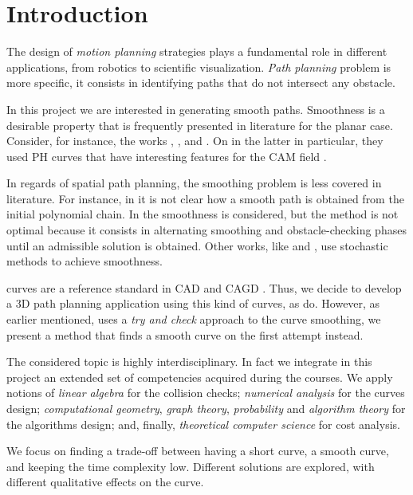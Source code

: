 \documentclass[dissertation.tex]{subfiles}
\begin{document}
\chapter{Introduction}
The design of \emph{motion planning} strategies plays a fundamental
role in different applications, from robotics to scientific
visualization. \emph{Path planning} problem is
more specific, it consists in identifying paths that do not
intersect any obstacle.

In this project we are interested in generating smooth
paths. Smoothness is a desirable property that is
frequently presented in literature for the planar case. Consider, for
instance, the works \cite{maekawa}, \cite{ho-liu}, \cite{li} and
\cite{giannelli}. On in the latter in particular, they used
\acf{PH} curves that have interesting features for the \acf{CAM} field
\cite{farouki}.

In regards of spatial path planning, the smoothing problem is less
covered in literature. For instance, in \cite{hrabar} it is not clear
how a smooth path is obtained from the initial polynomial chain. In
\cite{yang} the smoothness is considered, but the method is not
optimal because it consists in alternating smoothing and
obstacle-checking phases until an admissible solution is
obtained. Other works, like \cite{aghababa} and \cite{kroumov}, use 
stochastic methods to achieve smoothness.

\bs curves are a reference standard in \ac{CAD} and \ac{CAGD}
\cite{hughes}\cite{foley}\cite{farin}\cite{farin2}. Thus, we decide to
develop a 3D path planning application using this kind of curves, as
\cite{yang} do. However, as earlier mentioned,
\cite{yang} uses a \emph{try and check} approach to the curve
smoothing, we present a method that finds a smooth
curve on the first 
attempt instead.

The considered topic is highly interdisciplinary. In fact we integrate
in this project an extended set of
competencies acquired during the courses. We apply notions of
\emph{linear algebra} for the collision checks; \emph{numerical
  analysis} for the curves design; \emph{computational
  geometry},
\emph{graph theory}, \emph{probability} and \emph{algorithm theory}
for the algorithms design; and, finally, \emph{theoretical computer
  science} for cost analysis.

We focus on finding a trade-off between having a short curve, a
smooth curve, and keeping the time complexity low.
Different solutions are explored, with different qualitative effects
on the curve.
\end{document}
